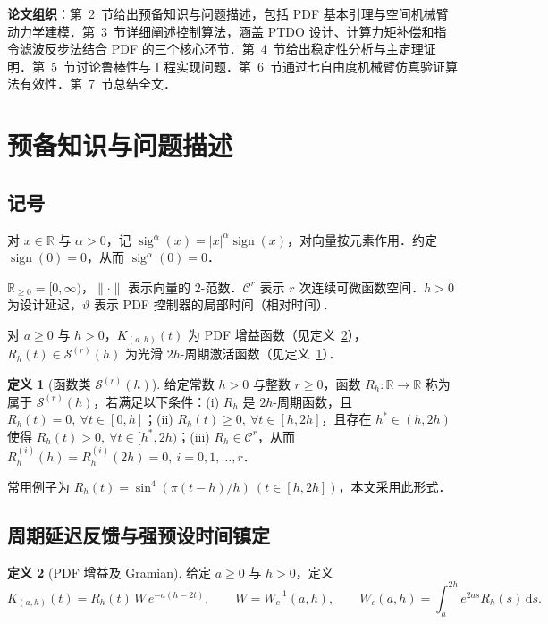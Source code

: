 \documentclass[12pt,a4paper]{article}
\theoremstyle{definition}
\newtheorem{definition}{定义}[section]
\theoremstyle{remark}
\newcommand{\sign}{\operatorname{sign}}
\newcommand{\sig}{\operatorname{sig}}
\newcommand{\R}{\mathbb{R}}
\newcommand{\cC}{\mathcal{C}}
\newcommand{\cS}{\mathcal{S}}
\newcommand{\vth}{\vartheta}
\begin{document}
\noindent\textbf{论文组织}：第~2~节给出预备知识与问题描述，包括 PDF 基本引理与空间机械臂动力学建模．第~3~节详细阐述控制算法，涵盖 PTDO 设计、计算力矩补偿和指令滤波反步法结合 PDF 的三个核心环节．第~4~节给出稳定性分析与主定理证明．第~5~节讨论鲁棒性与工程实现问题．第~6~节通过七自由度机械臂仿真验证算法有效性．第~7~节总结全文．


\section{预备知识与问题描述}

\subsection{记号}

对 $x\in\R$ 与 $\alpha>0$，记 $\sig^{\alpha}(x)=|x|^{\alpha}\sign(x)$，对向量按元素作用．约定 $\sign(0)=0$，从而 $\sig^{\alpha}(0)=0$．

$\R_{\ge 0}=[0,\infty)$，$\|\cdot\|$ 表示向量的 $2$-范数．$\cC^{r}$ 表示 $r$ 次连续可微函数空间．$h>0$ 为设计延迟，$\vth$ 表示 PDF 控制器的局部时间（相对时间）．

对 $a\ge 0$ 与 $h>0$，$K_{(a,h)}(t)$ 为 PDF 增益函数（见定义~\ref{def:pdf_gain}），$R_h(t)\in\cS^{(r)}(h)$ 为光滑 $2h$-周期激活函数（见定义~\ref{def:Sh}）．

\begin{definition}[函数类 $\cS^{(r)}(h)$]\label{def:Sh}
给定常数 $h>0$ 与整数 $r\ge 0$，函数 $R_h:\R\to\R$ 称为属于 $\cS^{(r)}(h)$，若满足以下条件：(i) $R_h$ 是 $2h$-周期函数，且 $R_h(t)=0,\ \forall t\in[0,h]$；(ii) $R_h(t)\ge 0,\ \forall t\in[h,2h]$，且存在 $h^*\in(h,2h)$ 使得 $R_h(t)>0,\ \forall t\in[h^*,2h)$；(iii) $R_h\in\cC^{r}$，从而 $R_h^{(i)}(h)=R_h^{(i)}(2h)=0,\ i=0,1,\dots,r$．
\end{definition}

常用例子为 $R_h(t)=\sin^{4}(\pi(t-h)/h)\ (t\in[h,2h])$，本文采用此形式．

\subsection{周期延迟反馈与强预设时间镇定}

\begin{definition}[PDF 增益及 Gramian]\label{def:pdf_gain}
给定 $a\ge 0$ 与 $h>0$，定义
\begin{equation}
  K_{(a,h)}(t)=R_h(t)\,W\,e^{-a(h-2t)},\qquad
  W=W_c^{-1}(a,h),\qquad
  W_c(a,h)=\int_h^{2h}e^{2as}R_h(s)\,\mathrm{d}s .
\end{equation}
\end{definition}
\end{document}
